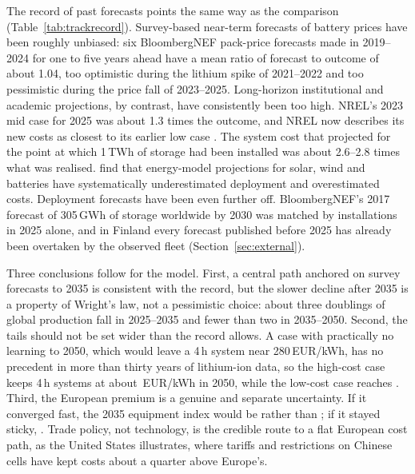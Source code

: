 \documentclass[11pt]{article}
\newcommand{\EUR}{EUR}
\begin{document}
The record of past forecasts points the same way as the comparison (Table~\ref{tab:trackrecord}).
Survey-based near-term forecasts of battery prices have been roughly unbiased: six BloombergNEF pack-price forecasts made in 2019--2024 for one to five years ahead have a mean ratio of forecast to outcome of about 1.04, too optimistic during the lithium spike of 2021--2022 and too pessimistic during the price fall of 2023--2025.
Long-horizon institutional and academic projections, by contrast, have consistently been too high. NREL's 2023 mid case for 2025 was about 1.3 times the outcome, and NREL now describes its new costs as closest to its earlier low case \citep{nrel2025batterycost}. The system cost that \citet{schmidt2017experience} projected for the point at which 1\,TWh of storage had been installed was about 2.6--2.8 times what was realised. \citet{way2022empirical} find that energy-model projections for solar, wind and batteries have systematically underestimated deployment and overestimated costs.
Deployment forecasts have been even further off. BloombergNEF's 2017 forecast of 305\,GWh of storage worldwide by 2030 was matched by installations in 2025 alone, and in Finland every forecast published before 2025 has already been overtaken by the observed fleet (Section~\ref{sec:external}).

Three conclusions follow for the model.
First, a central path anchored on survey forecasts to 2035 is consistent with the record, but the slower decline after 2035 is a property of Wright's law, not a pessimistic choice: about three doublings of global production fall in 2025--2035 and fewer than two in 2035--2050.
Second, the tails should not be set wider than the record allows. A case with practically no learning to 2050, which would leave a 4\,h system near 280\,\EUR/kWh, has no precedent in more than thirty years of lithium-ion data, so the high-cost case keeps 4\,h systems at about \,\EUR/kWh in 2050, while the low-cost case reaches .
Third, the European premium is a genuine and separate uncertainty. If it converged fast, the 2035 equipment index would be  rather than ; if it stayed sticky, . Trade policy, not technology, is the credible route to a flat European cost path, as the United States illustrates, where tariffs and restrictions on Chinese cells have kept costs about a quarter above Europe's.
\end{document}
